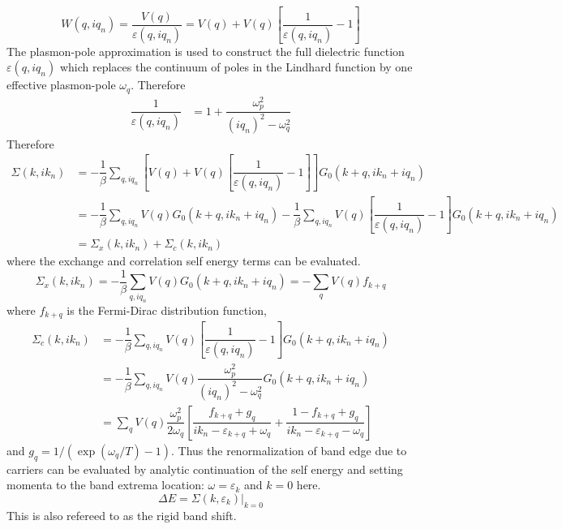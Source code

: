 \documentclass[aps,prb,onecolumn,notitlepage,showpacs,floatfix,superscriptaddress]{revtex4-1}
\begin{document}
\begin{equation}
W(q,iq_n) = \dfrac{V(q)}{\varepsilon(q,iq_n)} = V(q) + V(q) \left[ \dfrac{1}{\varepsilon(q,iq_n)}-1\right]
\end{equation}
The plasmon-pole approximation is used to construct the full dielectric function $\varepsilon(q,iq_n)$ which replaces the continuum of poles in the Lindhard function by one effective plasmon-pole $\omega_q$. Therefore
\begin{equation}
\begin{split}
\dfrac{1}{\varepsilon(q,iq_n)}&=1+ \dfrac{\omega_p^2}{( iq_n)^2-\omega_q^2}
\end{split} 
\end{equation}
Therefore
\begin{equation}
\begin{split}
\Sigma(k,ik_n) &= -\dfrac{1}{\beta} \sum_{q,iq_n} \left[ V(q) + V(q) \left[ \dfrac{1}{\varepsilon(q,iq_n)}-1\right] \right] G_0 (k+q,ik_n+iq_n) \\
&=  -\dfrac{1}{\beta} \sum_{q,iq_n}V(q)  G_0 (k+q,ik_n+iq_n) -\dfrac{1}{\beta} \sum_{q,iq_n} V(q) \left[ \dfrac{1}{\varepsilon(q,iq_n)}-1\right] G_0 (k+q,ik_n+iq_n) \\
&=\Sigma_x(k,ik_n) +\Sigma_c(k,ik_n) 
\end{split}
\end{equation}
where the exchange and correlation self energy terms can be evaluated.
\begin{equation}
\Sigma_x(k,ik_n) = -\dfrac{1}{\beta} \sum_{q,iq_n}V(q)  G_0 (k+q,ik_n+iq_n) = -\sum_q V(q) f_{k+q}
\end{equation}
where $f_{k+q}$ is the Fermi-Dirac distribution function,
\begin{equation}
\begin{split}
\Sigma_c(k,ik_n) &= -\dfrac{1}{\beta} \sum_{q,iq_n}V(q) \left[ \dfrac{1}{\varepsilon(q,iq_n)}-1\right] G_0 (k+q,ik_n+iq_n)  \\
&= -\dfrac{1}{\beta} \sum_{q,iq_n}V(q) \dfrac{\omega_p^2}{( iq_n)^2-\omega_q^2} G_0 (k+q,ik_n+iq_n)  \\
&= \sum_q V(q) \dfrac{\omega_p^2}{2\omega_q} \left[\dfrac{f_{k+q}+g_q}{ik_n - \varepsilon_{k+q}+\omega_q}+\dfrac{1-f_{k+q}+g_q}{ik_n - \varepsilon_{k+q}-\omega_q} \right]
\end{split}
\end{equation}
and $g_q = 1/(\exp(\omega_q /T)-1)$. Thus the renormalization of band edge due to carriers can be evaluated by analytic continuation of the self energy and setting momenta to the band extrema location:  $\omega = \varepsilon_k$ and $k=0$ here.
\begin{equation}
\Delta E = \Sigma(k,\varepsilon_k)\vert_{k=0}
\end{equation}
This is also refereed to as the rigid band shift.
\end{document}
